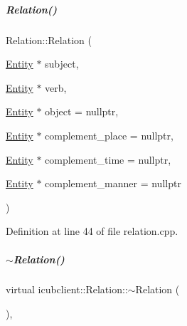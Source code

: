 \mbox{\label{group__icubclient__representations_a896d0c420059a0a133d4a8cdb3d7b8f6}} 
\subparagraph{\texorpdfstring{Relation()}{Relation()}\hspace{0.1cm}{\footnotesize\ttfamily [4/4]}}
{\footnotesize\ttfamily Relation\+::\+Relation (\begin{DoxyParamCaption}\item[{\hyperlink{group__icubclient__representations_classicubclient_1_1Entity}{Entity} $\ast$}]{subject,  }\item[{\hyperlink{group__icubclient__representations_classicubclient_1_1Entity}{Entity} $\ast$}]{verb,  }\item[{\hyperlink{group__icubclient__representations_classicubclient_1_1Entity}{Entity} $\ast$}]{object = {\ttfamily nullptr},  }\item[{\hyperlink{group__icubclient__representations_classicubclient_1_1Entity}{Entity} $\ast$}]{complement\+\_\+place = {\ttfamily nullptr},  }\item[{\hyperlink{group__icubclient__representations_classicubclient_1_1Entity}{Entity} $\ast$}]{complement\+\_\+time = {\ttfamily nullptr},  }\item[{\hyperlink{group__icubclient__representations_classicubclient_1_1Entity}{Entity} $\ast$}]{complement\+\_\+manner = {\ttfamily nullptr} }\end{DoxyParamCaption})}



Definition at line 44 of file relation.\+cpp.

\mbox{\label{group__icubclient__representations_a2539248fae2e1ff137e39d8fddf537ff}} 
\subparagraph{\texorpdfstring{$\sim$\+Relation()}{~Relation()}}
{\footnotesize\ttfamily virtual icubclient\+::\+Relation\+::$\sim$\+Relation (\begin{DoxyParamCaption}{ }\end{DoxyParamCaption})\hspace{0.3cm}{\ttfamily [inline]}, {\ttfamily [virtual]}}



